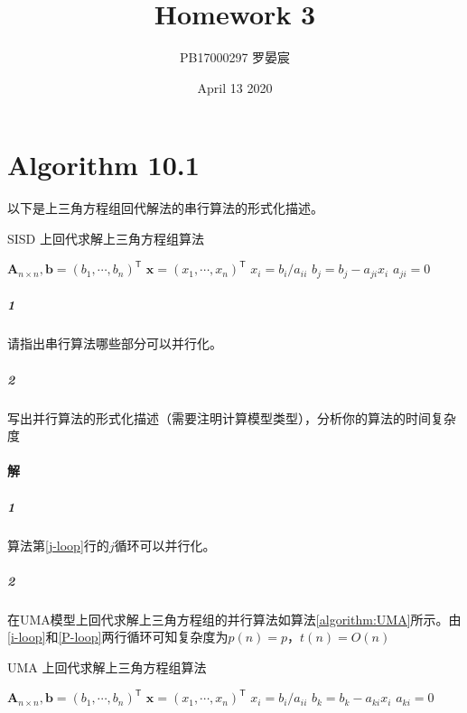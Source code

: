 \documentclass{article}
\title{Homework 3}
\author{PB17000297 罗晏宸}
\date{April 13 2020}
\begin{document}
\maketitle

\section{Algorithm 10.1}
以下是上三角方程组回代解法的串行算法的形式化描述。
\begin{algorithm}[h]
    \caption{SISD 上回代求解上三角方程组算法}
    \begin{algorithmic}[1]
        \Require $\boldsymbol{A}_{n \times n}, \boldsymbol{b} = (b_1, \cdots, b_n)^\mathsf{T}$
        \Ensure $\boldsymbol{x} = (x_1, \cdots, x_n)^\mathsf{T}$
        \Begin
        \State $x_i = b_i / a_{ii}$
         \label{j-loop}
        \State $b_j = b_j - a_{ji}x_i$
        \State $a_{ji} = 0$
        \EndFor
        \EndFor
        \End
    \end{algorithmic}
\end{algorithm}
\subparagraph{1} 请指出串行算法哪些部分可以并行化。
\subparagraph{2} 写出并行算法的形式化描述（需要注明计算模型类型），分析你的算法的时间复杂度

\paragraph{解}
\subparagraph{1}
算法第\ref{j-loop}行的$j$循环可以并行化。
\subparagraph{2}
在UMA模型上回代求解上三角方程组的并行算法如算法\ref{algorithm:UMA}所示。由\ref{i-loop}和\ref{P-loop}两行循环可知复杂度为$p(n) = p$，$t(n) = O(n)$
\begin{algorithm}[h]
    \caption{UMA 上回代求解上三角方程组算法}
    \label{algorithm:UMA}
    \begin{algorithmic}[1]
        \Require $\boldsymbol{A}_{n \times n}, \boldsymbol{b} = (b_1, \cdots, b_n)^\mathsf{T}$
        \Ensure $\boldsymbol{x} = (x_1, \cdots, x_n)^\mathsf{T}$
        \Begin
         \label{i-loop}
        \State $x_i = b_i / a_{ii}$
         \label{P-loop}
         
        \State $b_k = b_k - a_{ki}x_i$
        \State $a_{ki} = 0$
        \EndFor
        \EndFor
        \EndFor
        \End
    \end{algorithmic}
\end{algorithm}
\end{document}
